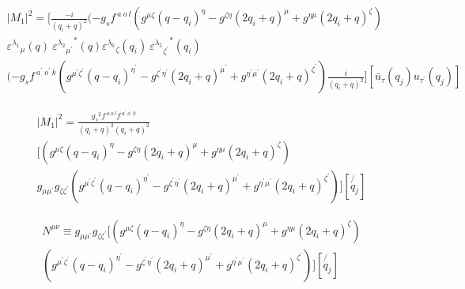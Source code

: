 \begin{equation}
\begin{split}
|M_1|^2=[\frac{-i}{(q_i +q)^2}(-g_s f^{\:a\:o\:l}(g^{{\mu}{\zeta}}(q-q_i)^{\eta}-g^{{\zeta}{\eta}}(2q_i +q)^{\mu}+g^{{\eta}{\mu}}(2q_i +q)^{\zeta})\\
{\varepsilon^{\lambda_1}}_{\mu} (q)\:{{\varepsilon^{\lambda_2}}_{{\mu}^{\prime}}}^* (q) {\varepsilon^{\lambda_6}}_{\zeta} (q_i)\:{{\varepsilon^{\lambda_5}}_{{\zeta}^{\prime}}}^* (q_i)\\
(-g_s f^{\:a^{\prime}\:o^{\prime}\:k}(g^{{{\mu}^{\prime}}{{\zeta}^{\prime}}}(q-q_i)^{{\eta}^{\prime}}-g^{{{\zeta}^{\prime}}{{\eta}^{\prime}}}(2q_i +q)^{{\mu}^{\prime}}+g^{{{\eta}^{\prime}}{{\mu}^{\prime}}}(2q_i +q)^{{\zeta}^{\prime}})\frac{i}{(q_i +q)^2}][\bar{u}_{\tau}(q_j){u}_{{\tau}^{\prime}}(q_j)]
\end{split}
\end{equation}


\begin{equation}
\begin{split}
|M_1|^2=\frac{{g_s}^2 f^{\:a\:o\:l} f^{\:a^{\prime}\:o^{\prime}\:k}}{(q_i +q)^2 (q_i +q)^2}\\
[(g^{{\mu}{\zeta}}(q-q_i)^{\eta}-g^{{\zeta}{\eta}}(2q_i +q)^{\mu}+g^{{\eta}{\mu}}(2q_i +q)^{\zeta})\\
g_{{\mu}{{\mu}^{\prime}}} g_{{\zeta}{{\zeta}^{\prime}}}
(g^{{{\mu}^{\prime}}{{\zeta}^{\prime}}}(q-q_i)^{{\eta}^{\prime}}-g^{{{\zeta}^{\prime}}{{\eta}^{\prime}}}(2q_i +q)^{{\mu}^{\prime}}+g^{{{\eta}^{\prime}}{{\mu}^{\prime}}}(2q_i +q)^{{\zeta}^{\prime}})][\not{q_j}]
\end{split}
\end{equation}

\begin{equation}
\begin{split}
N^{\mu \nu}\equiv g_{{\mu}{{\mu}^{\prime}}} g_{{\zeta}{{\zeta}^{\prime}}}
[(g^{{\mu}{\zeta}}(q-q_i)^{\eta}-g^{{\zeta}{\eta}}(2q_i +q)^{\mu}+g^{{\eta}{\mu}}(2q_i +q)^{\zeta})\\
(g^{{{\mu}^{\prime}}{{\zeta}^{\prime}}}(q-q_i)^{{\eta}^{\prime}}-g^{{{\zeta}^{\prime}}{{\eta}^{\prime}}}(2q_i +q)^{{\mu}^{\prime}}+g^{{{\eta}^{\prime}}{{\mu}^{\prime}}}(2q_i +q)^{{\zeta}^{\prime}})][\not{q_j}]
\end{split}
\end{equation}

